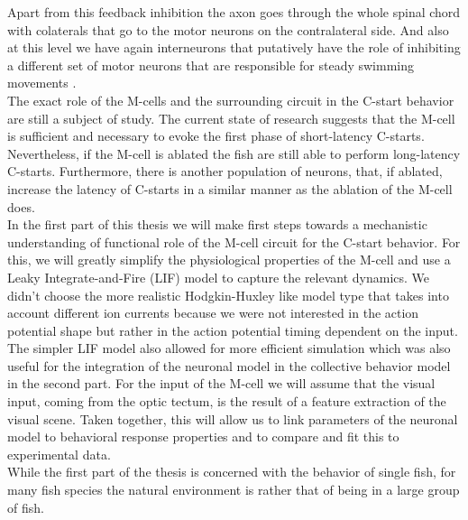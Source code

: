 \documentclass[a4paper,10pt,hidelinks]{scrreprt}
\begin{document}
	Apart from this feedback inhibition the axon goes through the whole spinal chord with 
	colaterals that go to the motor neurons on the contralateral side.
	And also at this level we have again interneurons that putatively have the role of inhibiting a 
	different set of motor neurons that are responsible for steady swimming movements 
	\citep{Song2015}.\\
	The exact role of the M-cells and the surrounding circuit in the C-start behavior are still a 
	subject of study.
	The current state of research suggests that the M-cell is sufficient and necessary to evoke 
	the first phase of short-latency C-starts.
	Nevertheless, if the M-cell is ablated the fish are still able to perform long-latency C-starts.
	Furthermore, there is another population of neurons, that, if ablated, increase the latency of 
	C-starts in a similar manner as the ablation of the M-cell does.\\
	In the first part of this thesis we will make first steps towards a mechanistic understanding 
	of 
	functional role of the M-cell circuit for the C-start behavior.
	For this, we will greatly simplify the physiological properties of the M-cell and use a Leaky 
	Integrate-and-Fire (LIF) model to capture the relevant dynamics.
	We didn't choose the more realistic Hodgkin-Huxley like model type that takes into account 
	different ion currents because we were not interested in the action potential shape but rather 
	in 
	the action potential timing dependent on the input.
	The simpler LIF model also allowed for more efficient simulation which was also useful for the 
	integration of the neuronal model in the collective behavior model in the second part.
	For the input of the M-cell we will assume that the visual input, coming from the optic tectum, 
	is the result of a feature extraction of the visual scene.
	Taken together, this will allow us to link parameters of the neuronal model to behavioral 
	response properties and to compare and fit this to experimental data.\\
	While the first part of the thesis is concerned with the behavior of single fish, for many fish 
	species the natural environment is rather that of being in a large group of fish.
\end{document}
